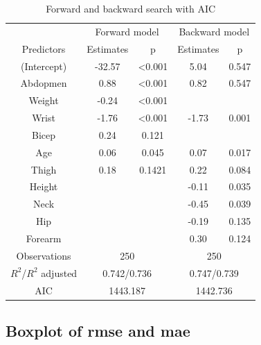 \documentclass[letterpaper,9pt,twocolumn,twoside,]{pinp}
\begin{document}
\begin{table}[!h]

\begin{tabular}{|c|c|c|c|c|}
\hline
\multicolumn{1}{|c|}{} & \multicolumn{2}{c|}{Forward model} & \multicolumn{2}{c|}{Backward model}\\

Predictors  & Estimates  & p & Estimates & p\\
\hline
(Intercept)  & -32.57 & <0.001 & 5.04 & 0.547 \\

Abdopmen  & 0.88 & <0.001 & 0.82 & 0.547 \\

Weight  & -0.24 & <0.001 &  & \\

Wrist  & -1.76 & <0.001 & -1.73 & 0.001 \\

Bicep  & 0.24 & 0.121 &  &  \\

Age  & 0.06 & 0.045 & 0.07 & 0.017 \\

Thigh  & 0.18 &0.1421 & 0.22 & 0.084 \\

Height  &  &  &-0.11 & 0.035 \\

Neck  &  &  &-0.45 & 0.039 \\

Hip  &  &  &-0.19 & 0.135 \\

Forearm &  &  &0.30 & 0.124 \\
\hline
\multicolumn{1}{|c|}{Observations} & \multicolumn{2}{c|}{250} & \multicolumn{2}{c|}{250}\\
\multicolumn{1}{|c|}{$R^2$/$R^2$ adjusted}
& \multicolumn{2}{c|}{0.742/0.736} & \multicolumn{2}{c|}{0.747/0.739}\\
\multicolumn{1}{|c|}{AIC} & \multicolumn{2}{c|}{1443.187} & \multicolumn{2}{c|}{1442.736}\\
\hline

\end{tabular}
\caption{Forward and backward search with AIC}
\label{table:label_here}
\end{table}

\hypertarget{boxplot-of-rmse-and-mae}{%
\subsection{Boxplot of rmse and mae}\label{boxplot-of-rmse-and-mae}}
\end{document}
